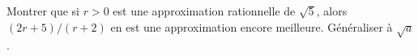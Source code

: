 Montrer que si $r > 0$ est une approximation rationnelle de $\sqrt{5}$, alors $(2r + 5)/(r + 2)$ en est une approximation encore meilleure. Généraliser à $\sqrt{a}$.
